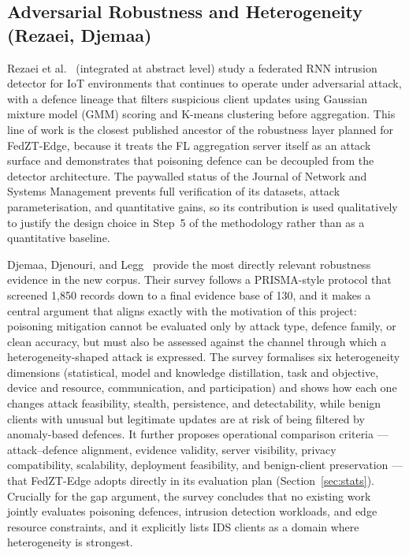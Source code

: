 \documentclass[11pt,a4paper]{article}
\begin{document}
\subsection{Adversarial Robustness and Heterogeneity (Rezaei, Djemaa)}
\label{sec:robust}

Rezaei et al.~\cite{rezaei2025} (integrated at abstract level) study a
federated RNN intrusion detector for IoT environments that continues to
operate under adversarial attack, with a defence lineage that filters
suspicious client updates using Gaussian mixture model (GMM) scoring and
K-means clustering before aggregation. This line of work is the closest
published ancestor of the robustness layer planned for FedZT-Edge, because
it treats the FL aggregation server itself as an attack surface and
demonstrates that poisoning defence can be decoupled from the detector
architecture. The paywalled status of the Journal of Network and Systems
Management prevents full verification of its datasets, attack
parameterisation, and quantitative gains, so its contribution is used
qualitatively to justify the design choice in Step~5 of the methodology
rather than as a quantitative baseline.

Djemaa, Djenouri, and Legg~\cite{djemaa2026} provide the most directly
relevant robustness evidence in the new corpus. Their survey follows a
PRISMA-style protocol that screened 1{,}850 records down to a final
evidence base of 130, and it makes a central argument that aligns exactly
with the motivation of this project: poisoning mitigation cannot be
evaluated only by attack type, defence family, or clean accuracy, but must
also be assessed against the channel through which a
heterogeneity-shaped attack is expressed. The survey formalises six
heterogeneity dimensions (statistical, model and knowledge distillation,
task and objective, device and resource, communication, and participation)
and shows how each one changes attack feasibility, stealth, persistence,
and detectability, while benign clients with unusual but legitimate
updates are at risk of being filtered by anomaly-based defences. It
further proposes operational comparison criteria --- attack--defence
alignment, evidence validity, server visibility, privacy compatibility,
scalability, deployment feasibility, and benign-client preservation ---
that FedZT-Edge adopts directly in its evaluation plan
(Section~\ref{sec:stats}). Crucially for the gap argument, the survey
concludes that no existing work jointly evaluates poisoning defences,
intrusion detection workloads, and edge resource constraints, and it
explicitly lists IDS clients as a domain where heterogeneity is strongest.
\end{document}
